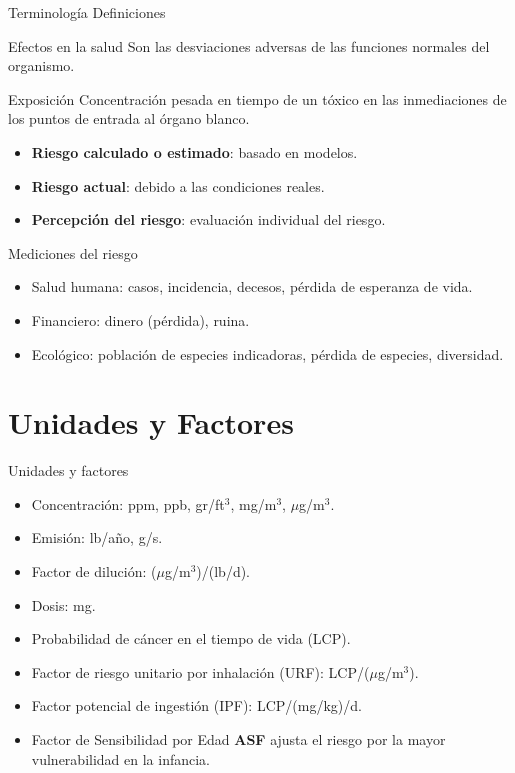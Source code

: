 \documentclass[10pt,compress]{beamer}
\begin{document}
\begin{frame}{Terminología Definiciones}
 \begin{block}{Efectos en la salud}
Son las desviaciones adversas de las funciones normales del organismo.
    \end{block}
 \begin{block}{Exposición}
Concentración pesada en tiempo de un tóxico en las inmediaciones de los puntos de entrada al órgano blanco.
    \end{block}

\begin{itemize}
\item \textbf{Riesgo calculado o estimado}: basado en modelos.
\item \textbf{Riesgo actual}: debido a las condiciones reales.
\item \textbf{Percepción del riesgo}: evaluación individual del riesgo.
\end{itemize}
\end{frame}
%
\begin{frame}{Mediciones del riesgo}
\begin{itemize}
\item Salud humana: casos, incidencia, decesos, pérdida de esperanza de vida.
\item Financiero: dinero (pérdida), ruina.
\item Ecológico: población de especies indicadoras, pérdida de especies, diversidad.
\end{itemize}
\end{frame}

\section{Unidades y Factores}
\begin{frame}{Unidades y factores}
\begin{itemize}
\item Concentración: ppm, ppb, gr/ft$^3$, mg/m$^3$, $\mu$g/m$^3$.
\item Emisión: lb/año, g/s.
\item Factor de dilución: ($\mu$g/m$^3$)/(lb/d).
\item Dosis: mg.
\item Probabilidad de cáncer en el tiempo de vida (LCP).
\item Factor de riesgo unitario por inhalación (URF): LCP/($\mu$g/m$^3$).
\item Factor potencial de ingestión (IPF): LCP/(mg/kg)/d.
\item Factor de Sensibilidad por Edad  \textbf{ASF} ajusta el riesgo por la mayor vulnerabilidad en la infancia.

\end{itemize}
\end{frame}
\end{document}
